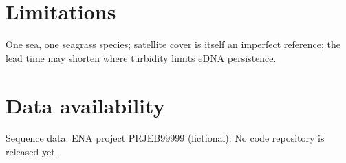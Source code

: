 \documentclass[11pt]{article}
\begin{document}
\section{Limitations}
One sea, one seagrass species; satellite cover is itself an imperfect reference; the lead time
may shorten where turbidity limits eDNA persistence.

\section{Data availability}
Sequence data: ENA project PRJEB99999 (fictional). No code repository is released yet.



\end{document}
